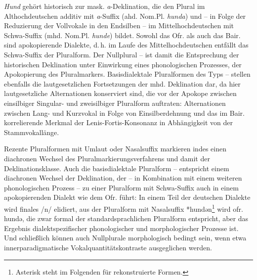 \textit{Hund} gehört historisch zur mask. \textit{a}{}-Deklination, die den Plural im Althochdeutschen additiv mit \textit{a}{}-Suffix (ahd. Nom.Pl. \textit{hunda}) und -- in Folge der Reduzierung der Vollvokale in den Endsilben -- im Mittelhochdeutschen mit Schwa-Suffix (mhd. Nom.Pl. \textit{hunde}) bildet. Sowohl das Ofr. als auch das Bair. sind apokopierende Dialekte, d.\,h. im Laufe des Mittelhochdeutschen entfällt das Schwa-Suffix der Pluralform. Der Nullplural  --  ist damit die Entsprechung der historischen Deklination unter Einwirkung eines phonologischen Prozesses, der Apokopierung des Pluralmarkers. Basisdialektale Pluralformen des Typs  --  stellen ebenfalls die lautgesetzlichen Fortsetzungen der mhd. Deklination dar, da hier lautgesetzliche Alternationen konserviert sind, die vor der Apokope zwischen einsilbiger Singular- und zweisilbiger Pluralform auftraten: Alternationen zwischen Lang- und Kurzvokal in Folge von Einsilberdehnung und das im Bair. korrelierende Merkmal der Lenis-Fortis-Konsonanz in Abhängigkeit von der Stammvokallänge.

Rezente Pluralformen mit Umlaut oder Nasalsuffix markieren indes einen diachronen Wechsel des Pluralmarkierungsverfahrens und damit der Deklinationsklasse. Auch die basisdialektale Pluralform  --  entspricht einem diachronen Wechsel der Deklination, der -- in Kombination mit einem weiteren phonologischen Prozess -- zu einer Pluralform mit Schwa-Suffix auch in einem apokopierenden Dialekt wie dem Ofr. führt: In einem Teil der deutschen Dialekte wird finales /n/ elidiert, aus der Pluralform mit Nasalsuffix *hundən\footnote{Asterisk steht im Folgenden für rekonstruierte Formen.} wird ofr. hundə, die zwar formal der standardsprachlichen Pluralform entspricht, aber das Ergebnis dialektspezifischer phonologischer und morphologischer Prozesse ist. Und schließlich können auch Nullplurale morphologisch bedingt sein, wenn etwa innerparadigmatische Vokalquantitätskontraste ausgeglichen werden.

